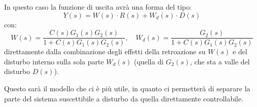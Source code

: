 \documentclass[a4paper,11pt]{article}
\begin{document}
\begin{itemize}
\begin{center}
		\end{center}

		In questo caso la funzione di uscita avrà una forma del tipo:
		$$
		Y(s) = W(s) \cdot R(s) + W_d(s) \cdot D(s)
		$$
		con:
		$$
		W(s) = \frac{C(s) G_1(s) G_2(s)}{1 + C(s) G_1(s) G_2(s)}, \quad W_d(s) = \frac{G_2(s)}{1 + C(s) G_1(s) G_2(s)}
		$$
		direttamente dalla combinazione degli effetti della retroazione su $W(s)$ e del disturbo interno sulla sola parte $W_d(s)$ (quella di $G_2(s)$, che sta a valle del disturbo $D(s)$).

		Questo sarà il modello che ci è più utile, in quanto ci permetterà di separare la parte del sistema suscettibile a disturbo da quella direttamente controllabile.

\end{itemize}
\end{document}
